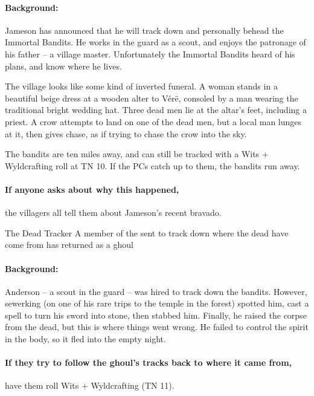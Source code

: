 \begin{multicols}{2}
\paragraph{Background:}
Jameson has announced that he will track down and personally behead the Immortal Bandits.
He works in the \gls{guard} as a scout, and enjoys the patronage of his father -- a village master.
Unfortunately the Immortal Bandits heard of his plans, and know where he lives.

\begin{boxtext}

  The village looks like some kind of inverted funeral.
  A woman stands in a beautiful beige dress at a wooden alter to V\'{e}r\"{e}, consoled by a man wearing the traditional bright wedding hat.
  Three dead men lie at the altar's feet, including a priest.
  A crow attempts to land on one of the dead men, but a local man lunges at it, then gives chase, as if trying to chase the crow into the sky.

\end{boxtext}

The bandits are ten miles away, and can still be tracked with a Wits + Wyldcrafting roll at TN 10.
If the PCs catch up to them, the bandits run away.

\paragraph{If anyone asks about why this happened,}
the villagers all tell them about Jameson's recent bravado.

{The Dead Tracker}%
{A member of the  sent to track down where the dead have come from has returned as a ghoul}%

\paragraph{Background:}
Anderson -- a scout in the \gls{guard} -- was hired to track down the bandits.
However, \gls{sewerking} (on one of his rare trips to the temple in the forest) spotted him, cast a spell to turn his sword into stone, then stabbed him. 
Finally, he raised the corpse from the dead, but this is where things went wrong.
He failed to control the spirit in the body, so it fled into the empty night.


\paragraph{If they try to follow the ghoul's tracks back to where it came from,}
have them roll Wits + Wyldcrafting (TN 11).


\end{multicols}
